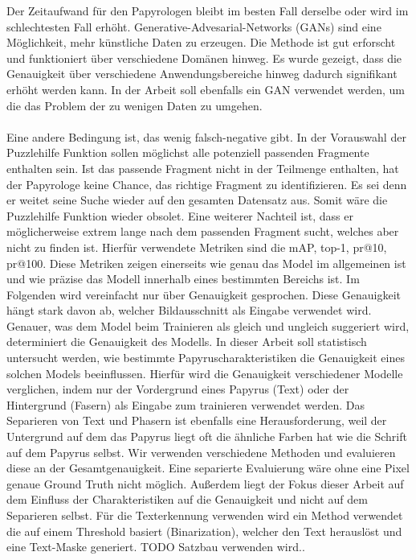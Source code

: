 \documentclass[12pt,a4paper]{article}
\begin{document}
Der Zeitaufwand für den Papyrologen bleibt im besten Fall derselbe oder wird im schlechtesten Fall erhöht. Generative-Advesarial-Networks (GANs) sind eine Möglichkeit, mehr künstliche Daten zu erzeugen.  Die Methode ist gut erforscht und funktioniert über verschiedene Domänen hinweg. Es wurde gezeigt, dass die Genauigkeit über verschiedene Anwendungsbereiche hinweg dadurch signifikant erhöht werden kann. In der Arbeit soll ebenfalls ein GAN verwendet werden, um die das Problem der zu wenigen Daten zu umgehen. 
\\\\
Eine andere Bedingung ist, das wenig falsch-negative gibt.
In der Vorauswahl der Puzzlehilfe Funktion sollen möglichst alle potenziell passenden Fragmente enthalten sein. Ist das passende Fragment nicht in der Teilmenge enthalten, hat der Papyrologe keine Chance, das richtige Fragment zu identifizieren. Es sei denn er weitet seine Suche wieder auf den gesamten Datensatz aus. Somit wäre die Puzzlehilfe Funktion wieder obsolet. Eine weiterer Nachteil ist, dass er möglicherweise extrem lange nach dem passenden Fragment sucht, welches aber nicht zu finden ist. 
Hierfür verwendete Metriken sind die mAP, top-1, pr@10, pr@100. Diese Metriken zeigen einerseits wie genau das Model im allgemeinen ist und wie präzise das Modell innerhalb eines bestimmten Bereichs ist. Im Folgenden wird vereinfacht nur über Genauigkeit gesprochen. Diese Genauigkeit hängt stark davon ab, welcher Bildausschnitt als Eingabe verwendet wird. Genauer, was dem Model beim Trainieren als gleich und ungleich suggeriert wird, determiniert die Genauigkeit des Modells. 
In dieser Arbeit soll statistisch untersucht werden, wie bestimmte Papyruscharakteristiken die Genauigkeit eines solchen Models beeinflussen. Hierfür wird die Genauigkeit verschiedener Modelle verglichen, indem nur der Vordergrund eines Papyrus (Text) oder der Hintergrund (Fasern) als Eingabe zum trainieren verwendet werden. 
Das Separieren von Text und Phasern ist ebenfalls eine Herausforderung, weil der Untergrund auf dem das Papyrus liegt oft die ähnliche Farben hat wie die Schrift auf dem Papyrus selbst. 
Wir verwenden verschiedene Methoden und evaluieren diese an der Gesamtgenauigkeit. Eine separierte Evaluierung wäre ohne eine Pixel genaue Ground Truth nicht möglich. Außerdem liegt der Fokus dieser Arbeit auf dem Einfluss der Charakteristiken auf die Genauigkeit und nicht auf dem Separieren selbst. Für die Texterkennung verwenden wird ein Method verwendet die auf einem Threshold basiert (Binarization), welcher den Text herauslöst und eine Text-Maske generiert. TODO Satzbau verwenden wird..
\end{document}

